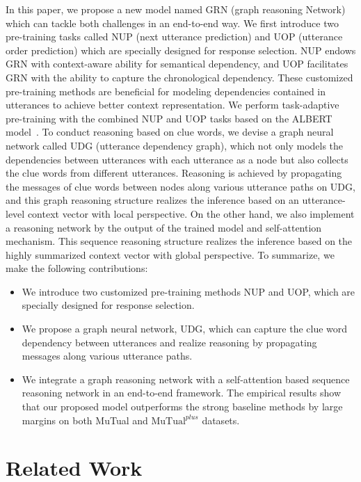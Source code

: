 \documentclass[letterpaper]{article}
\begin{document}
In this paper, we propose a new model named GRN (graph reasoning Network) which can tackle both challenges in an end-to-end way. We first introduce two pre-training tasks called NUP (next utterance prediction) and UOP (utterance order prediction) which are specially designed for response selection. NUP endows GRN with context-aware ability for semantical dependency, and UOP facilitates GRN with the ability to capture the chronological dependency. These customized pre-training methods are beneficial for modeling dependencies contained in utterances to achieve better context representation. We perform task-adaptive pre-training with the combined NUP and UOP tasks based on the ALBERT model~\cite{Lan2020}. To conduct reasoning based on clue words, we devise a graph neural network called UDG (utterance dependency graph), which not only models the dependencies between utterances with each utterance as a node but also collects the clue words from different utterances. Reasoning is achieved by propagating the messages of clue words between nodes along various utterance paths on UDG, and this graph reasoning structure realizes the inference based on an utterance-level context vector with local perspective. On the other hand, we also implement a reasoning network by the output of the trained model and self-attention mechanism. This sequence reasoning structure realizes the inference based on the highly summarized context vector with global perspective.
To summarize, we make the following contributions:

\begin{itemize}
    \item We introduce two customized pre-training methods NUP and UOP, which are specially designed for response selection.
    \item We propose a graph neural network, UDG, which can capture the clue word dependency between utterances and realize reasoning by propagating messages along various utterance paths.
    \item We integrate a graph reasoning network with a self-attention based sequence reasoning network in an end-to-end framework. The empirical results show that our proposed model outperforms the strong baseline methods by large margins on both MuTual and $\text{MuTual}^{plus}$ datasets.
\end{itemize}

\section{Related Work}
\end{document}
